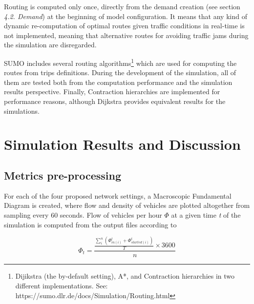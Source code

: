 \documentclass[11pt]{article}
\begin{document}

Routing is computed only once, directly from the demand creation (see section \textit{4.2. Demand}) at the beginning of model configuration. It means that any kind of dynamic re-computation of optimal routes given traffic conditions in real-time is not implemented, meaning that alternative routes for avoiding traffic jams during the simulation are disregarded. 

SUMO includes several routing algorithms\footnote{Dijikstra (the by-default setting), A*, and Contraction hierarchies in two different implementations. See: https://sumo.dlr.de/docs/Simulation/Routing.html} which are used for computing the routes from trips definitions. During the development of the simulation, all of them are tested both from the computation performance and the simulation results perspective. Finally, Contraction hierarchies are implemented for performance reasons, although Dijkstra provides equivalent results for the simulations.

\section{Simulation Results and Discussion}
\subsection{Metrics pre-processing}
For each of the four proposed network settings, a Macroscopic Fundamental Diagram is created, where flow and density of vehicles are plotted altogether from sampling every 60 seconds. 
Flow of vehicles per hour $\Phi$ at a given time \textit{t} of the simulation is computed from the output files according to

\begin{equation}
\Phi _t = \frac{\frac{\sum_{i}^{n}(\Phi_{in(i)}^t+\Phi_{started(i)}^t)}{T}\times 3600}{n}
\end{equation}
\end{document}
